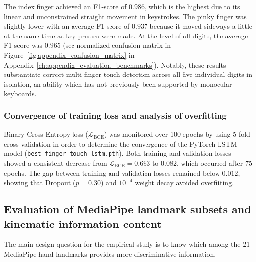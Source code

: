 The index finger achieved an F1-score of $0.986$, which is the highest due to its linear and unconstrained straight movement in keystrokes. The pinky finger was slightly lower with an average F1-score of $0.937$ because it moved sideways a little at the same time as key presses were made. At the level of all digits, the average F1-score was $0.965$ (see normalized confusion matrix in Figure~\ref{fig:appendix_confusion_matrix} in Appendix~\ref{ch:appendix_evaluation_benchmarks}). Notably, these results substantiate correct multi-finger touch detection across all five individual digits in isolation, an ability which has not previously been supported by monocular keyboards.

\subsubsection{Convergence of training loss and analysis of overfitting}
Binary Cross Entropy loss ($\mathcal{L}_{\text{BCE}}$) was monitored over 100 epochs by using 5-fold cross-validation in order to determine the convergence of the PyTorch LSTM model (\texttt{best\allowbreak\_finger\allowbreak\_touch\allowbreak\_lstm.pth}). Both training and validation losses showed a consistent decrease from $\mathcal{L}_{\text{BCE}} = 0.693$ to $0.082$, which occurred after 75 epochs. The gap between training and validation losses remained below $0.012$, showing that Dropout ($p = 0.30$) and $10^{-4}$ weight decay avoided overfitting.

\subsection{Evaluation of MediaPipe landmark subsets and kinematic information content}
\label{subsec:test_landmark_ablation}
The main design question for the empirical study is to know which among the 21 MediaPipe hand landmarks provides more discriminative information.

